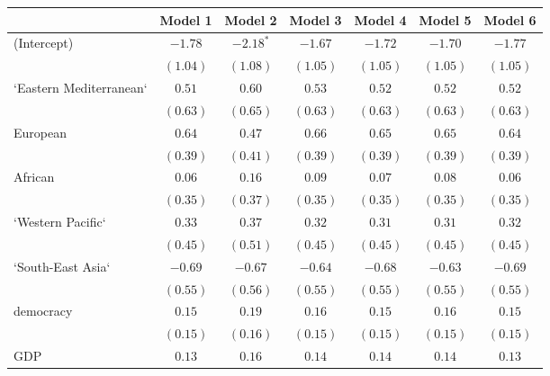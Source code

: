 
\begin{table}[!h]
\begin{center}
\begin{tabular}{l c c c c c c }
\toprule
 & Model 1 & Model 2 & Model 3 & Model 4 & Model 5 & Model 6 \\
\midrule
(Intercept)             & $-1.78$      & $-2.18^{*}$  & $-1.67$      & $-1.72$      & $-1.70$      & $-1.77$      \\
                        & $(1.04)$     & $(1.08)$     & $(1.05)$     & $(1.05)$     & $(1.05)$     & $(1.05)$     \\
`Eastern Mediterranean` & $0.51$       & $0.60$       & $0.53$       & $0.52$       & $0.52$       & $0.52$       \\
                        & $(0.63)$     & $(0.65)$     & $(0.63)$     & $(0.63)$     & $(0.63)$     & $(0.63)$     \\
European                & $0.64$       & $0.47$       & $0.66$       & $0.65$       & $0.65$       & $0.64$       \\
                        & $(0.39)$     & $(0.41)$     & $(0.39)$     & $(0.39)$     & $(0.39)$     & $(0.39)$     \\
African                 & $0.06$       & $0.16$       & $0.09$       & $0.07$       & $0.08$       & $0.06$       \\
                        & $(0.35)$     & $(0.37)$     & $(0.35)$     & $(0.35)$     & $(0.35)$     & $(0.35)$     \\
`Western Pacific`       & $0.33$       & $0.37$       & $0.32$       & $0.31$       & $0.31$       & $0.32$       \\
                        & $(0.45)$     & $(0.51)$     & $(0.45)$     & $(0.45)$     & $(0.45)$     & $(0.45)$     \\
`South-East Asia`       & $-0.69$      & $-0.67$      & $-0.64$      & $-0.68$      & $-0.63$      & $-0.69$      \\
                        & $(0.55)$     & $(0.56)$     & $(0.55)$     & $(0.55)$     & $(0.55)$     & $(0.55)$     \\
democracy               & $0.15$       & $0.19$       & $0.16$       & $0.15$       & $0.16$       & $0.15$       \\
                        & $(0.15)$     & $(0.16)$     & $(0.15)$     & $(0.15)$     & $(0.15)$     & $(0.15)$     \\
GDP                     & $0.13$       & $0.16$       & $0.14$       & $0.14$       & $0.14$       & $0.13$       \\

\end{tabular}
\end{center}
\end{table}
